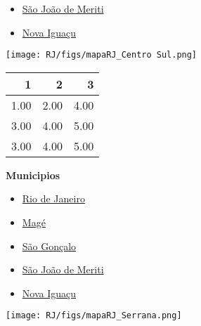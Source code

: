 \documentclass[10pt]{article} %
\begin{document}
\begin{minipage}[t]{.30\linewidth}
\begin{mdframed}[style=sidebar,frametitle={}]
\begin{itemize}
\item \hyperlink{SJMeriti}{São João de Meriti}
\item \hyperlink{Niguacu}{Nova Iguaçu}
\end{itemize}\end{mdframed}\hfill\end{minipage}\newpage\begin{minipage}[t]{.66\linewidth}
\hypertarget{CSul}{}
\texttt{[image: RJ/figs/mapaRJ\_Centro Sul.png]}\vspace{0.5cm}\begin{center}
\begin{tabular}{rrr}
  \hline
1 & 2 & 3 \\ 
  \hline
1.00 & 2.00 & 4.00 \\ 
  3.00 & 4.00 & 5.00 \\ 
  3.00 & 4.00 & 5.00 \\ 
   \hline
\end{tabular}
\end{center}
\end{minipage}\hfill\begin{minipage}[t]{.30\linewidth}
\begin{mdframed}[style=sidebar,frametitle={}]
\textbf{Municipios}\begin{itemize}\item \hyperlink{Rio}{Rio de Janeiro}
\item \hyperlink{Mag}{Magé}
\item \hyperlink{SGoncalo}{São Gonçalo}
\item \hyperlink{SJMeriti}{São João de Meriti}
\item \hyperlink{Niguacu}{Nova Iguaçu}
\end{itemize}\end{mdframed}\hfill\end{minipage}\newpage\begin{minipage}[t]{.66\linewidth}
\hypertarget{Serra}{}
\texttt{[image: RJ/figs/mapaRJ\_Serrana.png]}\vspace{0.5cm}\begin{center}
\begin{tabular}{rrr}

\end{tabular}
\end{center}
\end{minipage}
\end{document}
